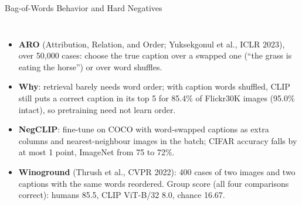 \begin{frame}{Bag-of-Words Behavior and Hard Negatives}
  \begin{columns}[T,onlytextwidth]
      \begin{itemize}\footnotesize\itemsep0.3em
        \item \textbf{ARO} (Attribution, Relation, and Order; Yuksekgonul et al., ICLR 2023), over 50{,}000 cases: choose the true caption over a swapped one (``the grass is eating the horse'') or over word shuffles.
        \item \textbf{Why}: retrieval barely needs word order; with caption words shuffled, CLIP still puts a correct caption in its top 5 for 85.4\% of Flickr30K images (95.0\% intact), so pretraining need not learn order.
        \item \textbf{NegCLIP}: fine-tune on COCO with word-swapped captions as extra columns and nearest-neighbour images in the batch; CIFAR accuracy falls by at most 1 point, ImageNet from 75 to 72\%.
        \item \textbf{Winoground} (Thrush et al., CVPR 2022): 400 cases of two images and two captions with the same words reordered. Group score (all four comparisons correct): humans 85.5, CLIP ViT-B/32 8.0, chance 16.67.
      \end{itemize}
      \centering
\end{columns}
\end{frame}
